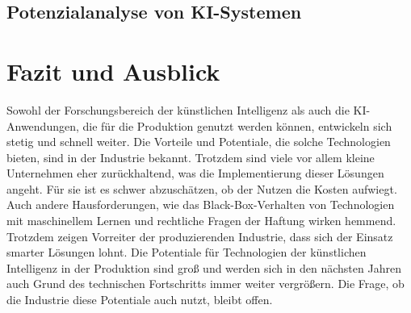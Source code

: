 \documentclass[a4paper,12pt, german]{report}
\begin{document}
\section{Potenzialanalyse von KI-Systemen}


\chapter{Fazit und Ausblick}

Sowohl der Forschungsbereich der künstlichen Intelligenz als auch die KI-Anwendungen, die für die Produktion genutzt werden können, entwickeln sich stetig und schnell weiter. Die Vorteile und Potentiale, die solche Technologien bieten, sind in der Industrie bekannt. Trotzdem sind viele vor allem kleine Unternehmen eher zurückhaltend, was die Implementierung dieser Lösungen angeht. Für sie ist es schwer abzuschätzen, ob der Nutzen die Kosten aufwiegt. Auch andere Hausforderungen, wie das Black-Box-Verhalten von Technologien mit maschinellem Lernen und rechtliche Fragen der Haftung wirken hemmend. Trotzdem zeigen Vorreiter der produzierenden Industrie, dass sich der Einsatz smarter Lösungen lohnt. Die Potentiale für Technologien der künstlichen Intelligenz in der Produktion sind groß und werden sich in den nächsten Jahren auch Grund des technischen Fortschritts immer weiter vergrößern. Die Frage, ob die Industrie diese Potentiale auch nutzt, bleibt offen.

\listoffigures

\clearpage




\appendix
\end{document}
